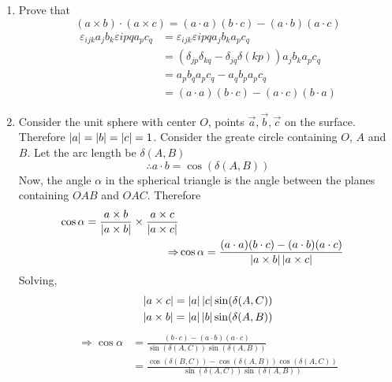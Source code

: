 \documentclass{article}
\numberwithin{equation}{section}
\begin{document}
\begin{eg}\leavevmode
    \begin{enumerate}[label=(\alph*)]
        \item Prove that 
        \begin{equation}
            (a \times b) \cdot (a \times c) = (a \cdot a)(b \cdot c) - (a \cdot b)(a \cdot c)
        \end{equation}
        \begin{align*}
            \varepsilon_{ijk}a_jb_k \varepsilon{ipq}a_pc_q &= \varepsilon_{ijk}\varepsilon{ipq}a_jb_ka_pc_q \\
            &= (\delta_{jp} \delta_{kq} - \delta_{jq} \delta(kp))a_jb_ka_pc_q \\
            &= a_p b_q a_p c_q  - a_q b_p a_p c_q \\
            &= (a \cdot a)(b \cdot c) - (a \cdot c)(b \cdot a)
        \end{align*}
        \item Consider the unit sphere with center $O$, points $\vec{a}, \vec{b}, \vec{c}$ on the surface.
        Therefore $\left\lvert a\right\rvert = \left\lvert b\right\rvert = \left\lvert c\right\rvert = 1$.
        Consider the greate circle containing $O$, $A$ and $B$.
        Let the arc length be $\delta(A, B)$
        \[
            \therefore a \cdot b = \cos(\delta(A, B))
        \]
        Now, the angle $\alpha$ in the spherical triangle is the angle between the planes containing $OAB$ and $OAC$.
        Therefore
        \begin{align*}
            \cos \alpha = \frac{a \times b}{\left\lvert a \times b\right\rvert} \times \frac{a \times c}{\left\lvert a \times c\right\rvert} \\
            \Rightarrow & \cos \alpha = \frac{(a \cdot a)(b \cdot c) - (a \cdot b)(a \cdot c)}{\left\lvert a \times b\right\rvert \left\lvert a \times c\right\rvert}
        \end{align*}
        Solving,
        \begin{align*}
            \left\lvert a \times c\right\rvert = \left\lvert a\right\rvert \left\lvert c\right\rvert \sin(\delta(A, C)) \\
            \left\lvert a \times b\right\rvert = \left\lvert a\right\rvert \left\lvert b\right\rvert \sin(\delta(A, B))
        \end{align*}
        \begin{align*}
            \Rightarrow \cos \alpha &= \frac{(b \cdot c) - (a \cdot b)(a \cdot c)}{\sin(\delta(A, C)) \sin(\delta(A, B))} \\
            &= \frac{\cos(\delta(B, C)) - \cos(\delta(A, B))\cos(\delta(A, C))}{\sin(\delta(A, C)) \sin(\delta(A, B))}

\end{align*}
\end{enumerate}
\end{eg}
\end{document}

